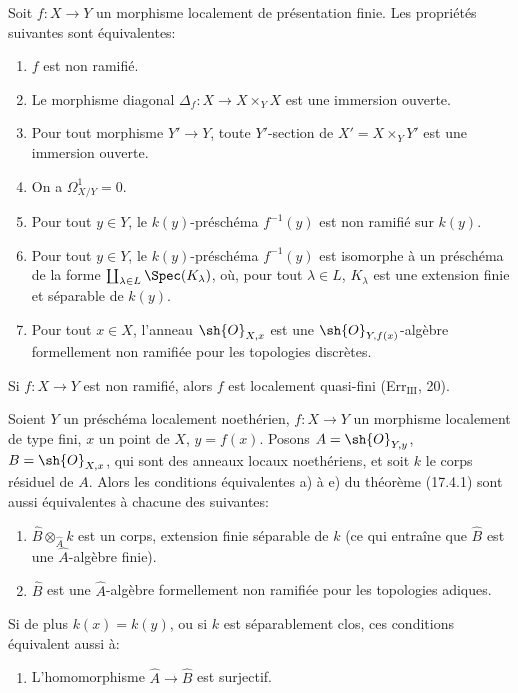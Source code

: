 \begin{corollary}[17.4.2]
\label{IV.17.4.2}
Soit $f:X\to Y$ un morphisme localement de présentation finie. Les propriétés suivantes sont équivalentes:
\begin{enumerate}
  \item[a)] $f$ est non ramifié.
  \item[b)] Le morphisme diagonal $\Delta_f:X\to X\times_Y X$ est une immersion ouverte.
  \item[b')] Pour tout morphisme $Y'\to Y$, toute $Y'$-section de $X'=X\times_Y Y'$ est une immersion ouverte.
  \item[c)] On a $\Omega^1_{X/Y}=0$.
  \item[d)] Pour tout $y\in Y$, le $k(y)$-préschéma $f^{-1}(y)$ est non ramifié sur $k(y)$.
  \item[d')] Pour tout $y\in Y$, le $k(y)$-préschéma $f^{-1}(y)$ est isomorphe à un préschéma de la forme $\coprod_{\lambda\in L}\Spec(K_\lambda)$, où, pour tout $\lambda\in L$, $K_\lambda$ est une extension finie et séparable de $k(y)$.
  \item[e)] Pour tout $x\in X$, l'anneau $\sh{O}_{X,x}$ est une $\sh{O}_{Y,f(x)}$-algèbre formellement non ramifiée pour les topologies discrètes.
\end{enumerate}
\end{corollary}

\begin{corollary}[17.4.3]
\label{IV.17.4.3}
Si $f:X\to Y$ est non ramifié, alors $f$ est localement quasi-fini (Err$_{\mathrm{III}}$, 20).
\end{corollary}

\begin{proposition}[17.4.4]
\label{IV.17.4.4}
Soient $Y$ un préschéma localement noethérien, $f:X\to Y$ un morphisme localement de type fini, $x$ un point de $X$, $y=f(x)$. Posons $A=\sh{O}_{Y,y}$, $B=\sh{O}_{X,x}$, qui sont des anneaux locaux noethériens, et soit $k$ le corps résiduel de $A$. Alors les conditions équivalentes a) à e) du théorème (17.4.1) sont aussi équivalentes à chacune des suivantes:
\begin{enumerate}
  \item[f)] $\widehat{B}\otimes_{\widehat{A}}k$ est un corps, extension finie séparable de $k$ (ce qui entraîne que $\widehat{B}$ est une $\widehat{A}$-algèbre finie).
  \item[f')] $\widehat{B}$ est une $\widehat{A}$-algèbre formellement non ramifiée pour les topologies adiques.
\end{enumerate}
Si de plus $k(x)=k(y)$, ou si $k$ est séparablement clos, ces conditions équivalent aussi à:
\begin{enumerate}
  \item[f'')] L'homomorphisme $\widehat{A}\to\widehat{B}$ est surjectif.
\end{enumerate}
\end{proposition}

